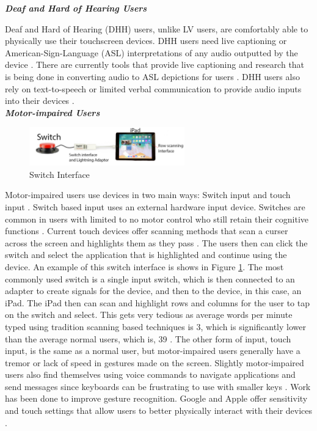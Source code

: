 \noindent \textbf{\textit{Deaf and Hard of Hearing Users}}
 
Deaf and Hard of Hearing (DHH) users, unlike LV users, are comfortably able to physically use their touchscreen devices. DHH users need live captioning or American-Sign-Language (ASL) interpretations of any audio outputted by the device \cite{5}. There are currently tools that provide live captioning \cite{34} and research that is being done in converting audio to ASL depictions for users \cite{35}. DHH users also rely on text-to-speech or limited verbal communication to provide audio inputs into their devices \cite{36}.\\

\noindent \textbf{\textit{Motor-impaired Users}}
\begin{figure}[h]
    \centering
    \includegraphics[width=0.6\textwidth]{imgs/switchInterface.jpg}
    \caption{Switch Interface}
    \label{fig:SwitchInterface}
\end{figure}

Motor-impaired users use devices in two main ways: Switch input and touch input \cite{2}. Switch based input uses an external hardware input device. Switches are common in users with limited to no motor control who still retain their cognitive functions \cite{2}. Current touch devices offer scanning methods that scan a curser across the screen and highlights them as they pass \cite{25,26}. The users then can click the switch and select the application that is highlighted and continue using the device. An example of this switch interface is shows in Figure \ref{fig:SwitchInterface}. The most commonly used switch is a single input switch, which is then connected to an adapter to create signals for the device, and then to the device, in this case, an iPad. The iPad then can scan and highlight rows and columns for the user to tap on the switch and select. This gets very tedious as average words per minute typed using tradition scanning based techniques is 3, which is significantly lower than the average normal users, which is, 39 \cite{37}. The other form of input, touch input, is the same as a normal user, but motor-impaired users generally have a tremor or lack of speed in gestures made on the screen. Slightly motor-impaired users also find themselves using voice commands to navigate applications and send messages since keyboards can be frustrating to use with smaller keys \cite{2}. Work has been done to improve gesture recognition. Google and Apple offer sensitivity and touch settings that allow users to better physically interact with their devices \cite{12,25,26}.\\ 

